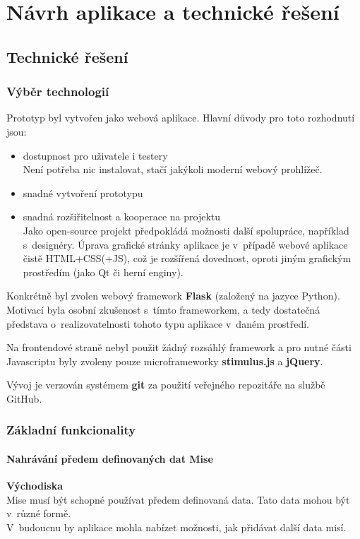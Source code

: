 \chapter{Návrh aplikace a technické řešení}

\section{Technické řešení}
\subsection{Výběr technologií}
Prototyp byl vytvořen jako webová aplikace.
Hlavní důvody pro toto rozhodnutí jsou:
\begin{itemize}
	\item dostupnost pro uživatele i testery\\
	Není potřeba nic instalovat, stačí jakýkoli moderní webový prohlížeč.
	\item snadné vytvoření prototypu
	\item snadná rozšiřitelnost a kooperace na projektu\\ Jako open-source projekt předpokládá možnosti další spolupráce, například s~designéry. Úprava grafické stránky aplikace je v~případě webové aplikace čistě HTML+CSS(+JS), což je rozšířená dovednost, oproti jiným grafickým prostředím (jako Qt či herní enginy).
\end{itemize}

Konkrétně byl zvolen webový framework \textbf{Flask} (založený na jazyce Python). Motivací byla osobní zkušenost s~tímto frameworkem, a tedy dostatečná představa o~realizovatelnosti tohoto typu aplikace v~daném prostředí.

Na frontendové straně nebyl použit žádný rozsáhlý framework a pro nutné části Javascriptu byly zvoleny pouze microframeworky \textbf{stimulus.js} a \textbf{jQuery}.

Vývoj je verzován systémem \textbf{git} za použití veřejného repozitáře na službě GitHub.

\subsection{Základní funkcionality}
\subsubsection*{Nahrávání předem definovaných dat Mise}
	\textbf{Východiska}\\
	Mise musí být schopné používat předem definovaná data. Tato data mohou být v~různé formě.\\
	V~budoucnu by aplikace mohla nabízet možnosti, jak přidávat další data misí.
	
